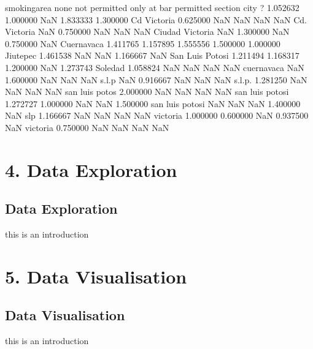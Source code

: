\documentclass[letterpaper,10pt,english]{jupyterBook}
\begin{document}
\begin{sphinxVerbatim}[commandchars=\\\{\}]
smoking\PYGZus{}area          none  not permitted  only at bar  permitted   section
city                                                                       
?                 1.052632       1.000000          NaN   1.833333  1.300000
Cd Victoria       0.625000            NaN          NaN        NaN       NaN
Cd. Victoria           NaN       0.750000          NaN        NaN       NaN
Ciudad Victoria        NaN       1.300000          NaN   0.750000       NaN
Cuernavaca        1.411765       1.157895     1.555556   1.500000  1.000000
Jiutepec          1.461538            NaN          NaN   1.166667       NaN
San Luis Potosi   1.211494       1.168317     1.200000        NaN  1.273743
Soledad           1.058824            NaN          NaN        NaN       NaN
cuernavaca             NaN       1.600000          NaN        NaN       NaN
s.l.p                  NaN       0.916667          NaN        NaN       NaN
s.l.p.            1.281250            NaN          NaN        NaN       NaN
san luis potos    2.000000            NaN          NaN        NaN       NaN
san luis potosi   1.272727       1.000000          NaN        NaN  1.500000
san luis potosi        NaN            NaN          NaN   1.400000       NaN
slp               1.166667            NaN          NaN        NaN       NaN
victoria          1.000000       0.600000          NaN   0.937500       NaN
victoria          0.750000            NaN          NaN        NaN       NaN
\end{sphinxVerbatim}


\part{4. Data Exploration}


\chapter{Data Exploration}
\label{\detokenize{c4_data_exploration/introduction:data-exploration}}\label{\detokenize{c4_data_exploration/introduction::doc}}
\sphinxAtStartPar
this is an introduction


\part{5. Data Visualisation}


\chapter{Data Visualisation}
\label{\detokenize{c5_data_visualisation/introduction:data-visualisation}}\label{\detokenize{c5_data_visualisation/introduction::doc}}
\sphinxAtStartPar
this is an introduction
\end{document}
